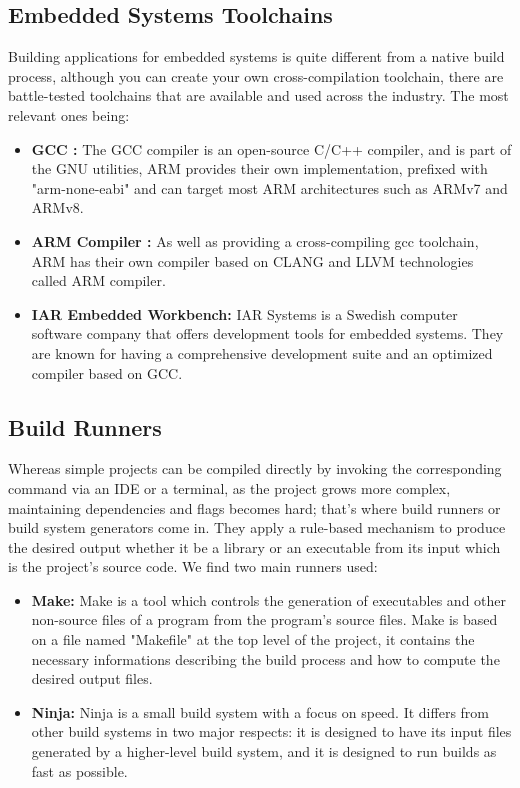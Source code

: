 \subsection{Embedded Systems Toolchains}
Building applications for embedded systems is quite different from a native build process, although you can create your own cross-compilation toolchain, there are battle-tested toolchains that are available and used across the industry. The most relevant ones being:
\begin{itemize}
    \item \textbf{GCC :} The GCC compiler is an open-source C/C++ compiler, and is part of the GNU utilities, ARM provides their own implementation, prefixed with "arm-none-eabi" and can target most ARM architectures such as ARMv7 and ARMv8.
    \item \textbf{ARM Compiler :} As well as providing a cross-compiling gcc toolchain, ARM has their own compiler based on CLANG and LLVM technologies called ARM compiler.
    \item \textbf{IAR Embedded Workbench:} IAR Systems is a Swedish computer software company that offers development tools for embedded systems. They are known for having a comprehensive development suite and an optimized compiler based on GCC.
\end{itemize}
\subsection{Build Runners}
Whereas simple projects can be compiled directly by invoking the corresponding command via an IDE or a terminal, as the project grows more complex, maintaining dependencies and flags becomes hard; that's where build runners or build system generators come in. They apply a rule-based mechanism to produce the desired output whether it be a library or an executable from its input which is the project's source code.
We find two main runners used:
\begin{itemize}
    \item \textbf{Make:} Make is a tool which controls the generation of executables and other non-source files of a program from the program's source files. Make is based on a file named "Makefile" at the top level of the project, it contains the necessary informations describing the build process and how to compute the desired output files.
    \item \textbf{Ninja:} Ninja is a small build system with a focus on speed. It differs from other build systems in two major respects: it is designed to have its input files generated by a higher-level build system, and it is designed to run builds as fast as possible.
\end{itemize}
\newpage
